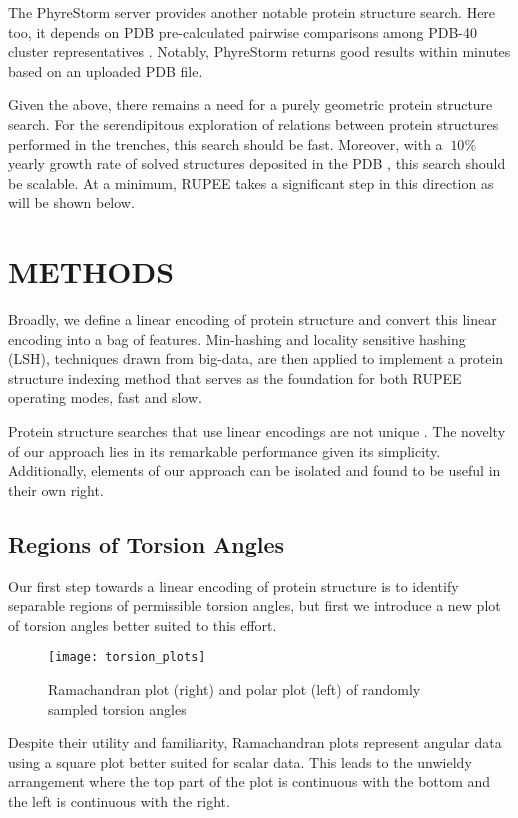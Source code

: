 \documentclass[a4,center,fleqn]{NAR}
\begin{document}
The PhyreStorm server \cite{Mezulis2016} provides another notable protein structure search.
Here too, it depends on PDB pre-calculated pairwise comparisons among PDB-40 cluster representatives \cite{Prlic2010}. 
Notably, PhyreStorm returns good results within minutes based on an uploaded PDB file. 

Given the above, there remains a need for a purely geometric protein structure search.
For the serendipitous exploration of relations between protein structures performed in the trenches, this search should be fast. 
Moreover, with a $~10\%$ yearly growth rate of solved structures deposited in the PDB \cite{gkw1000}, this search should be scalable. 
At a minimum, RUPEE takes a significant step in this direction as will be shown below. 

\section{METHODS}

Broadly, we define a linear encoding of protein structure and convert this linear encoding into a bag of features. 
Min-hashing and locality sensitive hashing (LSH), techniques drawn from big-data, are then applied to implement a protein structure indexing method that serves as the foundation for both RUPEE operating modes, fast and slow. 

Protein structure searches that use linear encodings are not unique \cite{Carpentier2005,Daniluk2011,Ritchie2012}.
The novelty of our approach lies in its remarkable performance given its simplicity. 
Additionally, elements of our approach can be isolated and found to be useful in their own right. 

\subsection{Regions of Torsion Angles}

Our first step towards a linear encoding of protein structure is to identify separable regions of permissible torsion angles,
but first we introduce a new plot of torsion angles better suited to this effort. 

\begin{figure*}[tb]
\centering
\texttt{[image: torsion\_plots]}
\caption{Ramachandran plot (right) and polar plot (left) of randomly sampled torsion angles}
\label{fig:torsion_plots}
\end{figure*}

Despite their utility and familiarity, Ramachandran plots \cite{Ramachandran1968} represent angular data using a square plot better suited for scalar data.
This leads to the unwieldy arrangement where the top part of the plot is continuous with the bottom and the left is continuous with the right. 
\end{document}
